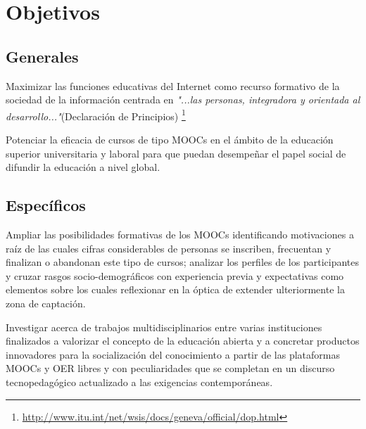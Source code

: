 \documentclass[10pt]{article}
\begin{document}

\section{Objetivos}

\begin{description}

\subsection{Generales}

\item Maximizar las funciones educativas del Internet como recurso formativo de la sociedad de la información centrada en \textit {"...las personas, integradora y orientada al desarrollo..."}(Declaración de Principios) \footnote{\url{http://www.itu.int/net/wsis/docs/geneva/official/dop.html}}

\item Potenciar la eficacia de cursos de tipo MOOCs en el ámbito de la educación superior universitaria y laboral para que puedan desempeñar el papel social de difundir la educación a nivel global.

\subsection{Específicos}
\item Ampliar las posibilidades formativas de los MOOCs identificando motivaciones a raíz de las cuales cifras considerables de personas se inscriben, frecuentan y finalizan o abandonan este tipo de cursos; analizar los perfiles de los participantes y cruzar rasgos socio-demográficos con experiencia previa y expectativas como elementos sobre los cuales reflexionar en la óptica de extender ulteriormente la zona de captación.

\item Investigar acerca de trabajos multidisciplinarios entre varias instituciones finalizados a valorizar el concepto de la educación abierta y a concretar productos innovadores para la socialización del conocimiento a partir de las plataformas MOOCs y OER libres y con peculiaridades que se completan en un discurso tecnopedagógico actualizado a las exigencias contemporáneas.



\end{description}
\end{document}
